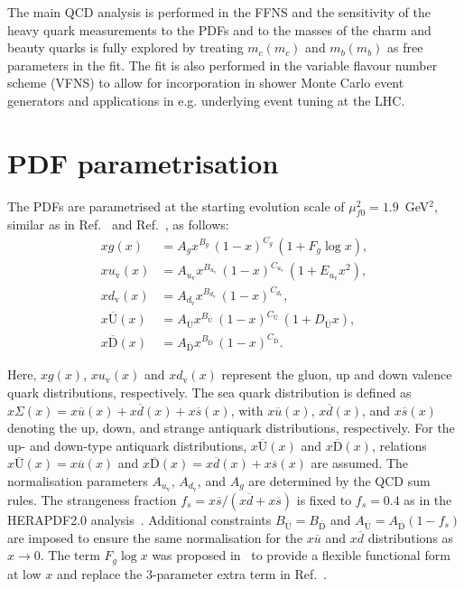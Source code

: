 \documentclass[12pt]{article}
\begin{document}
The main QCD analysis is performed in the FFNS and the sensitivity of the heavy quark measurements to the PDFs and to the masses 
of the charm and beauty quarks is fully explored by treating $m_c(m_c)$ and $m_b(m_b)$ as free parameters in the fit.
The fit is also performed in the variable flavour number scheme (VFNS) to allow for incorporation in shower Monte Carlo event generators and applications in e.g. 
underlying event tuning at the LHC.


\section{PDF parametrisation}
\label{sec:pdfparam}

The PDFs are parametrised at the starting evolution scale of $\mu^2_{f0} = 1.9$~GeV$^2$, similar as in Ref.~\cite{Abramowicz:2015mha} and Ref.~\cite{Bonvini:2019wxf}, as follows:
\begin{equation}\begin{aligned}
xg(x) &= A_{g} x^{B_{g}}\,(1-x)^{C_{g}}\, (1 + F_{g} {\log x}),\\
xu_\mathrm{v}(x) &= A_{u_\mathrm{v}}x^{B_{u_\mathrm{v}}}\,(1-x)^{C_{u_\mathrm{v}}}\,(1+E_{u_\mathrm{v}}x^2) ,\\
xd_\mathrm{v}(x) &= A_{d_\mathrm{v}}x^{B_{d_\mathrm{v}}}\,(1-x)^{C_{d_\mathrm{v}}},\\
x\overline{\mathrm{U}}(x)&= A_{\overline{\mathrm{U}}}x^{B_{\overline{\mathrm{U}}}}\, (1-x)^{C_{\overline{\mathrm{U}}}}\, (1+D_{\overline{\mathrm{U}}}x), \\
x\overline{\mathrm{D}}(x)&= A_{\overline{\mathrm{D}}}x^{B_{\overline{\mathrm{D}}}}\, (1-x)^{C_{\overline{\mathrm{D}}}}.
\end{aligned}
\label{eq:dv}
\end{equation}

Here, $xg(x)$, $xu_{\mathrm{v}}(x)$ and $xd_{\mathrm{v}}(x)$ represent the gluon, up and down valence quark distributions, respectively. The sea quark distribution is defined as $x\Sigma(x)=x\overline{u}(x)+x\overline{d}(x)+x\overline{s}(x)$, with $x\overline{u}(x)$, $x\overline{d}(x)$, and $x\overline{s}(x)$ denoting the up, down, and strange antiquark distributions, respectively.
For the up- and down-type antiquark distributions, $x\overline{\mathrm{U}}(x)$ and $x\overline{\mathrm{D}}(x)$, relations $x\overline{\mathrm{U}}(x) = x\overline{u}(x)$ and $x\overline{\mathrm{D}}(x) = x\overline{d}(x) + x\overline{s}(x)$  are assumed.
The normalisation parameters $A_{u_{\mathrm{v}}}$, $A_{d_\mathrm{v}}$, and $A_{g}$ are determined by the QCD sum rules.
The strangeness fraction $f_{s} = x\overline{s}/( x\overline{d} + x\overline{s})$ is fixed to
$f_{s}=0.4$ as in the HERAPDF2.0 analysis~\cite{Abramowicz:2015mha}.
Additional constraints $B_{\overline{\mathrm{U}}} = B_{\overline{\mathrm{D}}}$ and $A_{\overline{\mathrm{U}}} = A_{\overline{\mathrm{D}}}(1 - f_{s})$ are imposed to ensure the same normalisation for the $x\overline{u}$ and $x\overline{d}$ distributions as $x \to 0$.
The term $F_g\log x$ was proposed in~\cite{Bonvini:2019wxf} to provide a flexible functional form at low $x$ and replace the 3-parameter extra term in Ref.~\cite{Abramowicz:2015mha}.
\end{document}
